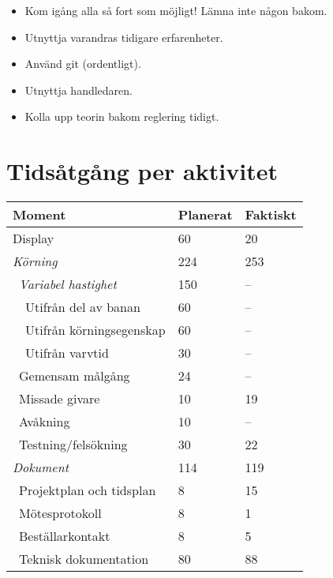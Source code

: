 \documentclass[10pt,oneside,swedish]{lips}
\begin{document}
\begin{itemize}
	\item Kom igång alla så fort som möjligt! Lämna inte någon bakom.
	\item Utnyttja varandras tidigare erfarenheter.
	\item Använd git (ordentligt).
	\item Utnyttja handledaren.
	\item Kolla upp teorin bakom reglering tidigt.
\end{itemize}
\appendix
\section{Tidsåtgång per aktivitet}

\begin{tabular}{|l|l|l|} \hline
	\textbf{Moment}                      & \textbf{Planerat}    & \textbf{Faktiskt}    \\\hline
Display                     &          60 &          20 \\\hline
\emph{Körning}                    &         224 &         253 \\\hline
  \ \emph{Variabel hastighet}        &         150 &           -- \\\hline
    \ \ Utifrån del av banan    &          60 &           -- \\\hline
    \ \ Utifrån körningsegenskap&          60 &         -- \\\hline
    \ \ Utifrån varvtid         &          30 &           -- \\\hline
  \ Gemensam målgång          &          24 &           -- \\\hline
  \ Missade givare            &          10 &          19 \\\hline
  \ Avåkning                  &          10 &           -- \\\hline
  \ Testning/felsökning       &          30 &          22 \\\hline
\emph{Dokument}                    &         114 &           119 \\\hline
  \ Projektplan och tidsplan  &           8 &          15 \\\hline
  \ Mötesprotokoll            &           8 &           1 \\\hline
  \ Beställarkontakt          &           8 &           5 \\\hline
  \ Teknisk dokumentation     &          80 &          88 \\\hline

\end{tabular}
\end{document}
